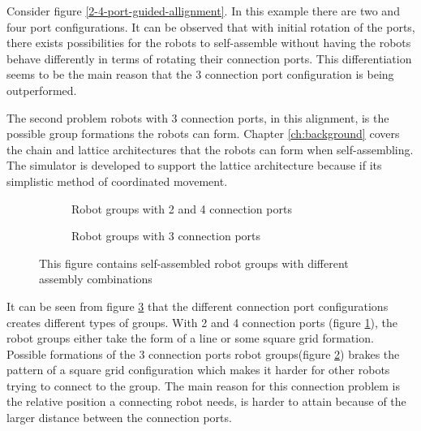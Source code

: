 Consider figure \ref{2-4-port-guided-allignment}.
In this example there are two and four port configurations.
It can be observed that with initial rotation of the ports, there exists possibilities for the robots to self-assemble without having the robots behave differently in terms of rotating their connection ports.
This differentiation seems to be the main reason that the 3 connection port configuration is being outperformed.

The second problem robots with 3 connection ports, in this alignment, is the possible group formations the robots can form.
Chapter \ref{ch:background} covers the chain and lattice architectures that the robots can form when self-assembling. %
The simulator is developed to support the lattice architecture because if its simplistic method of coordinated movement.

\begin{figure}[H]
	\begin{subfigure}[t]{0.49\textwidth}
		\centering
		\caption{Robot groups with 2 and 4 connection ports}
		\label{2-4-port-architecture}
	\end{subfigure}
	\begin{subfigure}[t]{0.49\textwidth}
		\centering
		\caption{Robot groups with 3 connection ports}
		\label{3-port-architecture}
	\end{subfigure}
	\caption{This figure contains self-assembled robot groups with different assembly combinations}
	\label{port-architectures}
\end{figure}

It can be seen from figure \ref{port-architectures} that the different connection port configurations creates different types of groups. 
With 2 and 4 connection ports (figure \ref{2-4-port-architecture}), the robot groups either take the form of a line or some square grid formation.
Possible formations of the 3 connection ports robot groups(figure \ref{3-port-architecture}) brakes the pattern of a square grid configuration which makes it harder for other robots trying to connect to the group.
The main reason for this connection problem is the relative position a connecting robot needs, is harder to attain because of the larger distance between the connection ports.

